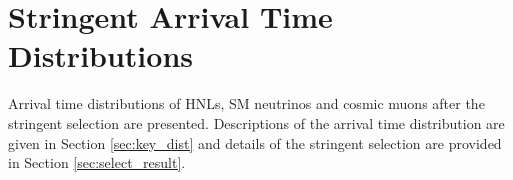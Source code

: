 
\chapter{Stringent Arrival Time Distributions} 
\label{appendix_stringent}
\ifpdf
    \graphicspath{{Appendix5/Figs/Raster/}{Appendix5/Figs/PDF/}{Appendix5/Figs/}}
\else
    \graphicspath{{Appendix5/Figs/Vector/}{Appendix5/Figs/}}
\fi

Arrival time distributions of HNLs, SM neutrinos and cosmic muons after the stringent selection are presented.
Descriptions of the arrival time distribution are given in Section \ref{sec:key_dist} and details of the stringent selection are provided in Section \ref{sec:select_result}.

